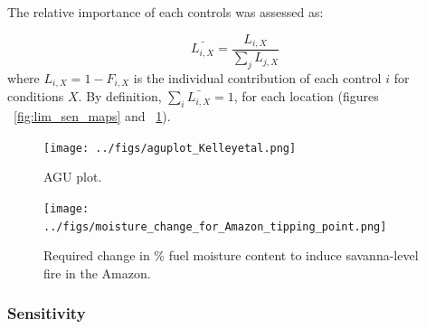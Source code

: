 The relative importance of each controls was assessed as:

\begin{equation}
    \bar{L_{i, X}} = \frac{L_{i, X}}{\sum_{j} L_{j, X}}
\end{equation}
where $L_{i, X} = 1 - F_{i,X}$ is the individual contribution of each control $i$ for conditions $X$. By definition, $\sum_{i} \bar{L_{i,X}} = 1$, for each location (figures ~\ref{fig:lim_sen_maps} and ~\ref{fig:agu_plot}).


\begin{figure}[!ht]
  \centering
    \texttt{[image: ../figs/aguplot\_Kelleyetal.png]}

  \caption{AGU plot.}
  \label{fig:agu_plot}
\end{figure}


\begin{figure}[!ht]
  \centering
    \texttt{[image: ../figs/moisture\_change\_for\_Amazon\_tipping\_point.png]}

  \caption{Required change in \% fuel moisture content to induce savanna-level fire in the Amazon.}
  \label{fig:amazon}
\end{figure}

\subsubsection{Sensitivity}


